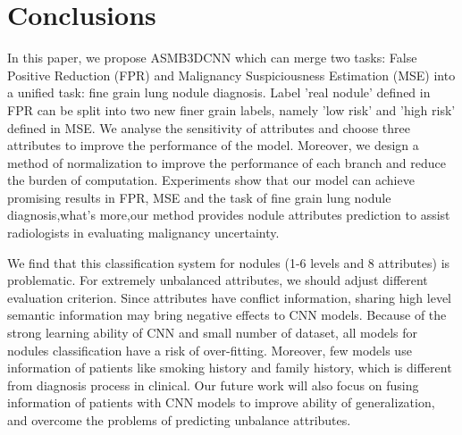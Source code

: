 \documentclass[runningheads]{llncs}
\begin{document}
\section{Conclusions}
\label{conclude}
In this paper, we propose ASMB3DCNN which can merge two tasks: False Positive Reduction (FPR) and Malignancy Suspiciousness Estimation (MSE) into a unified task: fine grain lung nodule diagnosis. Label 'real nodule' defined in FPR can be split into two new finer grain labels, namely 'low risk' and 'high risk' defined in MSE.
We analyse the sensitivity of attributes and choose three attributes to improve the performance of the model.
Moreover, we design a method of normalization to improve the performance of each branch and reduce the burden of computation.
Experiments show that our model can achieve promising results in FPR, MSE and the task of fine grain lung nodule diagnosis,what's more,our method provides nodule attributes prediction to assist radiologists in evaluating malignancy uncertainty.

 We find that this classification system for nodules (1-6 levels and 8 attributes) is problematic. For extremely unbalanced attributes, we should adjust different evaluation criterion. Since attributes have conflict information,  sharing high level semantic information may bring negative effects to CNN models. 
Because of the strong learning ability of CNN and small number of dataset, all models for nodules classification have a risk of over-fitting. Moreover, few models use information of patients like smoking history and family history, which is different from diagnosis process in clinical. Our future work will also focus on fusing information of patients with CNN models to improve ability of generalization, and overcome the problems of predicting unbalance attributes.
 

%

%
%
\end{document}
